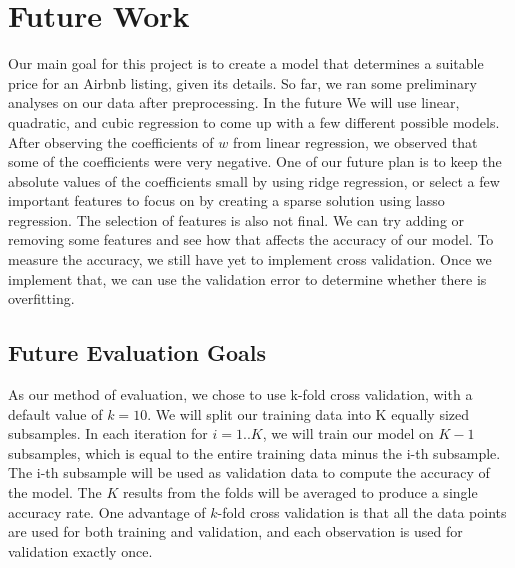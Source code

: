 \documentclass{article}
\begin{document}
\section{Future Work}
Our main goal for this project is to create a model that determines a suitable price for an Airbnb listing, given its details. So far, we ran some preliminary analyses on our data after preprocessing. In the future We will use linear, quadratic, and cubic regression to come up with a few different possible models. After observing the coefficients of $w$ from linear regression, we observed that some of the coefficients were very negative. One of our future plan is to keep the absolute values of the coefficients small by using ridge regression, or select a few important features to focus on by creating a sparse solution using lasso regression. The selection of features is also not final. We can try adding or removing some features and see how that affects the accuracy of our model. To measure the accuracy, we still have yet to implement cross validation. Once we implement that, we can use the validation error to determine whether there is overfitting.

\subsection{Future Evaluation Goals}
As our method of evaluation, we chose to use k-fold cross validation, with a default value of $k=10$. We will split our training data into K equally sized subsamples. In each iteration for $i=1..K$, we will train our model on $K-1$ subsamples, which is equal to the entire training data minus the i-th subsample. The i-th subsample will be used as validation data to compute the accuracy of the model. The $K$ results from the folds will be averaged to produce a single accuracy rate. One advantage of $k$-fold cross validation is that all the data points are used for both training and validation, and each observation is used for validation exactly once.
\end{document}
